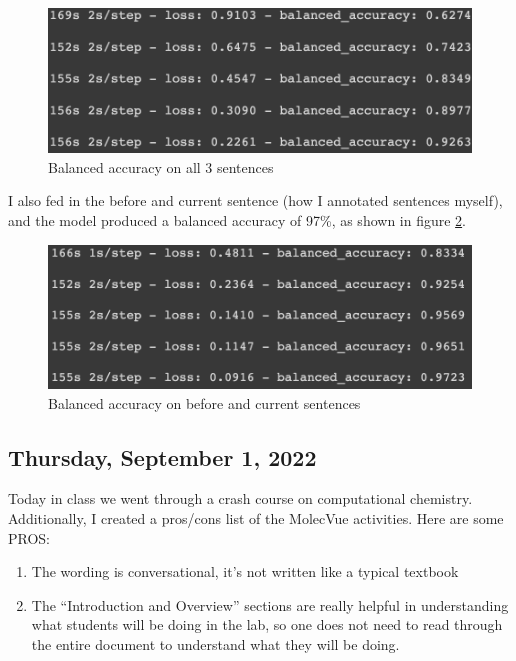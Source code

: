 \documentclass[11pt,letterpaper]{article}
\begin{document}
\begin{figure}
    \centering
    \includegraphics{images/92.png}
    \caption{Balanced accuracy on all 3 sentences}
    \label{fig:92}
\end{figure}

I also fed in the before and current sentence (how I annotated sentences myself), and the model produced a balanced accuracy of 97\%, as shown in figure \ref{fig:97}.

\begin{figure}
    \centering
    \includegraphics{images/97.png}
    \caption{Balanced accuracy on before and current sentences}
    \label{fig:97}
\end{figure}

\subsection{Thursday, September 1, 2022}
Today in class we went through a crash course on computational chemistry. 
Additionally, I created a pros/cons list of the MolecVue activities. Here are some PROS:

\begin{enumerate}
    \item The wording is conversational, it’s not written like a typical textbook
    \item The “Introduction and Overview” sections are really helpful in understanding what students will be doing in the lab, so one does not need to read through the entire document to understand what they will be doing.
\end{enumerate}
\end{document}

